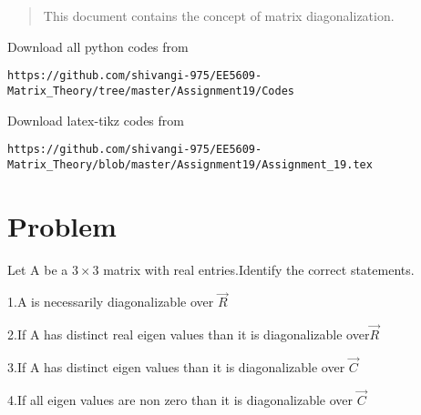 \documentclass[journal,12pt,twocolumn]{IEEEtran}
\begin{document}
%
\vspace{2ex}
\begin{center}
\end{center}
\begin{abstract}
This document contains the concept of matrix  diagonalization.
\end{abstract}
Download all python codes from 
%
\begin{lstlisting}
https://github.com/shivangi-975/EE5609-Matrix_Theory/tree/master/Assignment19/Codes
\end{lstlisting}
%
Download latex-tikz codes from 
%
\begin{lstlisting}
https://github.com/shivangi-975/EE5609-Matrix_Theory/blob/master/Assignment19/Assignment_19.tex
\end{lstlisting}
%
\section{Problem}
Let A be a $3\times 3$  matrix  with real entries.Identify  the correct statements.

1.A  is necessarily diagonalizable over $\vec{R}$

2.If A has distinct real  eigen values than  it is diagonalizable over$\vec{R}$

3.If A has distinct eigen values than  it is diagonalizable over $\vec{C}$

4.If all eigen values are non zero than it is diagonalizable over $\vec{C}$
\end{document}
